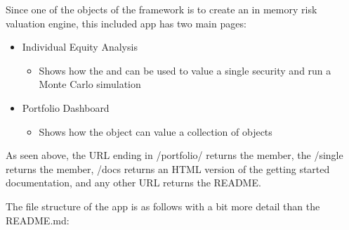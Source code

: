 \documentclass[letterpaper,10pt,english]{sphinxmanual}
\begin{document}
\sphinxAtStartPar
Since one of the objects of the  framework is to create an
in memory risk valuation engine, this included app has two main pages:
\begin{itemize}
\item {} 
\sphinxAtStartPar
Individual Equity Analysis 
\begin{itemize}
\item {} 
\sphinxAtStartPar
Shows how the  and  can be used to
value a single security and run a Monte Carlo simulation

\end{itemize}

\item {} 
\sphinxAtStartPar
Portfolio Dashboard 
\begin{itemize}
\item {} 
\sphinxAtStartPar
Shows how the  object can value a collection of
 objects

\end{itemize}

\end{itemize}

\sphinxAtStartPar
As seen above, the URL ending in /portfolio/ returns the
 member, the /single returns the
 member, /docs returns an HTML version of the
getting started documentation, and any other URL returns the README.

\sphinxAtStartPar
The file structure of the app is as follows with a bit more detail than
the README.md:

\begin{sphinxVerbatim}[commandchars=\\\{\}]
 
 
 
     
     
 
     
     
     
\end{sphinxVerbatim}
\end{document}
